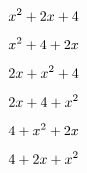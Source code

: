 \documentclass[10pt,a4paper]{article}
\begin{document}
	\[\newtrinomio{1}{2}{4}{0}\]
	
	\[\newtrinomio{1}{2}{4}{1}\]
	
	\[\newtrinomio{1}{2}{4}{2}\]
	
	\[\newtrinomio{1}{2}{4}{3}\]
	
	\[\newtrinomio{1}{2}{4}{4}\]
	
	\[\newtrinomio{1}{2}{4}{5}\]
\end{document}
